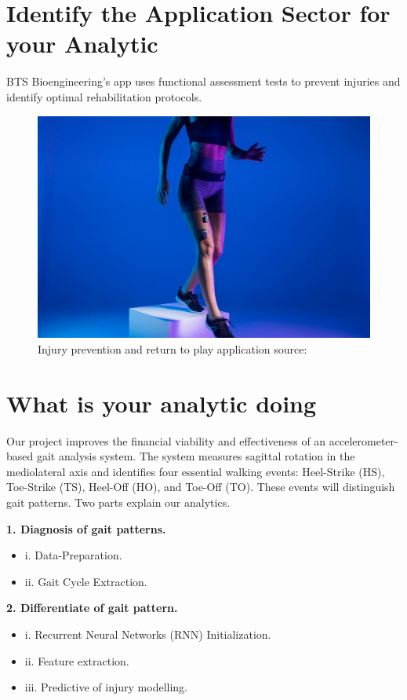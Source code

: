 \section{Identify the Application Sector for your Analytic}
\STANDARD{\insertsection}
{ 
BTS Bioengineering's app uses functional assessment tests to prevent injuries and identify optimal rehabilitation protocols. 
  \begin{figure}
    \centering
    \includegraphics[scale=0.1]{img/Injury prevention and return to play.jpeg}
    \caption{Injury prevention and return to play application source: \cite{BTS_Injury_prevention2022}}
    \label{fig:Injury prevention and return to play}
\end{figure}
}

\section{What is your analytic doing}
\STANDARD{\insertsection}
{
    Our project improves the financial viability and effectiveness of an accelerometer-based gait analysis system. The system measures sagittal rotation in the mediolateral axis and identifies four essential walking events: Heel-Strike (HS), Toe-Strike (TS), Heel-Off (HO), and Toe-Off (TO). These events will distinguish gait patterns. Two parts explain our analytics.
    
    \bigskip
    \textbf{1. Diagnosis of gait patterns.}
    
    \begin{itemize}
    \item   i. Data-Preparation.
    \item  ii. Gait Cycle Extraction.
    \end{itemize}
    \textbf{2. Differentiate of gait pattern.}
    \begin{itemize}
    \item   i. Recurrent Neural Networks (RNN) Initialization.
    \item  ii. Feature extraction.
    \item iii. Predictive of injury modelling.
    \end{itemize}
}


